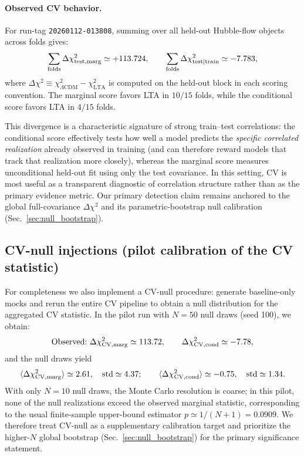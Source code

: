 \documentclass[10pt]{article}
\begin{document}
\paragraph{Observed CV behavior.}
For run-tag \texttt{20260112-013808}, summing over all held-out Hubble-flow objects across folds
gives:
\begin{equation}
\sum_{\rm folds}\Delta\chi^2_{\rm test,marg} \simeq +113.724,\qquad
\sum_{\rm folds}\Delta\chi^2_{\rm test\mid train} \simeq -7.783,
\end{equation}
where \(\Delta\chi^2\equiv \chi^2_{\Lambda\mathrm{CDM}}-\chi^2_{\mathrm{LTA}}\) is computed on the
held-out block in each scoring convention. The marginal score favors LTA in \(10/15\) folds, while
the conditional score favors LTA in \(4/15\) folds.

This divergence is a characteristic signature of strong train--test correlations: the conditional
score effectively tests how well a model predicts the \emph{specific correlated realization} already
observed in training (and can therefore reward models that track that realization more closely),
whereas the marginal score measures unconditional held-out fit using only the test covariance.
In this setting, CV is most useful as a transparent diagnostic of correlation structure rather than
as the primary evidence metric. Our primary detection claim remains anchored to the global
full-covariance \(\Delta\chi^2\) and its parametric-bootstrap null calibration
(Sec.~\ref{sec:null_bootstrap}).

\subsection{CV-null injections (pilot calibration of the CV statistic)}
\label{sec:cv_null}

For completeness we also implement a CV-null procedure: generate baseline-only mocks and rerun the
entire CV pipeline to obtain a null distribution for the aggregated CV statistic. In the pilot run
with \(N=50\) null draws (seed 100), we obtain:
\begin{equation}
\text{Observed:}\ \Delta\chi^2_{\rm CV,marg} \simeq 113.72,\qquad
\Delta\chi^2_{\rm CV,cond} \simeq -7.78,
\end{equation}
and the null draws yield
\begin{equation}
\langle \Delta\chi^2_{\rm CV,marg}\rangle \simeq 2.61,\quad
\mathrm{std}\simeq 4.37;\qquad
\langle \Delta\chi^2_{\rm CV,cond}\rangle \simeq -0.75,\quad
\mathrm{std}\simeq 1.34.
\end{equation}
With only \(N=10\) null draws, the Monte Carlo resolution is coarse; in this pilot, none of the
null realizations exceed the observed marginal statistic, corresponding to the usual finite-sample
upper-bound estimator \(p\simeq 1/(N+1)=0.0909\). We therefore treat CV-null as a supplementary
calibration target and prioritize the higher-$N$ global bootstrap (Sec.~\ref{sec:null_bootstrap})
for the primary significance statement.
\end{document}
